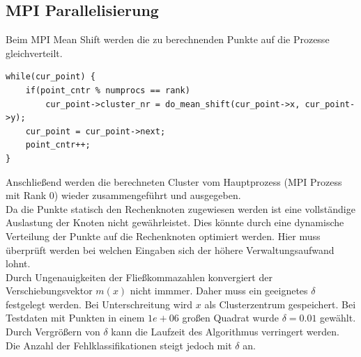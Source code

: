 	\subsection{MPI Parallelisierung}
	Beim MPI Mean Shift werden die zu berechnenden Punkte auf die Prozesse gleichverteilt.
	\begin{lstlisting}
while(cur_point) {
    if(point_cntr % numprocs == rank)
        cur_point->cluster_nr = do_mean_shift(cur_point->x, cur_point->y);
    cur_point = cur_point->next;
    point_cntr++;
}
	\end{lstlisting}
	Anschließend werden die berechneten Cluster vom Hauptprozess (MPI Prozess mit Rank 0) wieder zusammengeführt und ausgegeben.\\
	Da die Punkte statisch den Rechenknoten zugewiesen werden ist eine vollständige Auslastung der Knoten nicht gewährleistet. 
	Dies könnte durch eine dynamische Verteilung der Punkte auf die Rechenknoten optimiert werden. Hier muss überprüft werden bei welchen Eingaben
	sich der höhere Verwaltungsaufwand lohnt.\\
	Durch Ungenauigkeiten der Fließkommazahlen konvergiert der Verschiebungsvektor $ m(x) $ nicht immmer. Daher muss ein geeignetes $ \delta $
	festgelegt werden. Bei Unterschreitung wird $ x $ als Clusterzentrum gespeichert. Bei Testdaten mit Punkten in einem 
	$ 1e + 06 $ großen Quadrat wurde $ \delta = 0.01 $ gewählt. Durch Vergrößern von $ \delta $ kann die Laufzeit des Algorithmus verringert werden.
	Die Anzahl der Fehlklassifikationen steigt jedoch mit $ \delta $ an.\\
	\vspace{-15pt}
